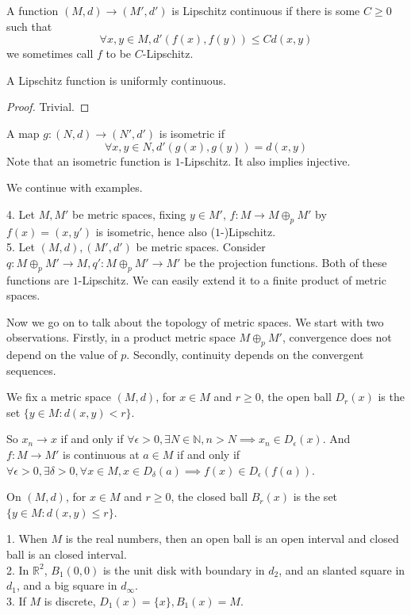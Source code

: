 \begin{definition}
    A function $(M,d)\to (M',d')$ is Lipschitz continuous if there is some $C\ge 0$ such that
    $$\forall x,y\in M,d'(f(x),f(y))\le Cd(x,y)$$
    we sometimes call $f$ to be $C$-Lipschitz.
\end{definition}
\begin{proposition}
    A Lipschitz function is uniformly continuous.
\end{proposition}
\begin{proof}
    Trivial.
\end{proof}
\begin{definition}
    A map $g:(N,d)\to (N',d')$ is isometric if
    $$\forall x,y\in N,d'(g(x),g(y))=d(x,y)$$
    Note that an isometric function is $1$-Lipschitz.
    It also implies injective.
\end{definition}
We continue with examples.
\begin{example}
    4. Let $M,M'$ be metric spaces, fixing $y\in M'$, $f:M\to M\oplus_pM'$ by $f(x)=(x,y')$ is isometric, hence also ($1$-)Lipschitz.\\
    5. Let $(M,d), (M',d')$ be metric spaces.
    Consider $q:M\oplus_pM'\to M, q':M\oplus_pM'\to M'$ be the projection functions.
    Both of these functions are $1$-Lipschitz. %
    We can easily extend it to a finite product of metric spaces. 
\end{example}
Now we go on to talk about the topology of metric spaces.
We start with two observations.
Firstly, in a product metric space $M\oplus_pM'$, convergence does not depend on the value of $p$.
Secondly, continuity depends on the convergent sequences.
\begin{definition}
    We fix a metric space $(M,d)$, for $x\in M$ and $r\ge 0$, the open ball $D_r(x)$ is the set $\{y\in M:d(x,y)<r\}$.
\end{definition}
So $x_n\to x$ if and only if $\forall\epsilon>0,\exists N\in\mathbb N, n>N\implies x_n\in D_\epsilon(x)$.
And $f:M\to M'$ is continuous at $a\in M$ if and only if $\forall\epsilon>0,\exists\delta>0,\forall x\in M,x\in D_\delta(a)\implies f(x)\in D_\epsilon(f(a))$.
\begin{definition}
    On $(M,d)$, for $x\in M$ and $r\ge 0$, the closed ball $B_r(x)$ is the set $\{y\in M:d(x,y)\le r\}$.
\end{definition}
\begin{example}
    1. When $M$ is the real numbers, then an open ball is an open interval and closed ball is an closed interval.\\
    2. In $\mathbb R^2$, $B_1(0,0)$ is the unit disk with boundary in $d_2$, and an slanted square in $d_1$, and a big square in $d_\infty$.\\
    3. If $M$ is discrete, $D_1(x)=\{x\},B_1(x)=M$.
\end{example}

